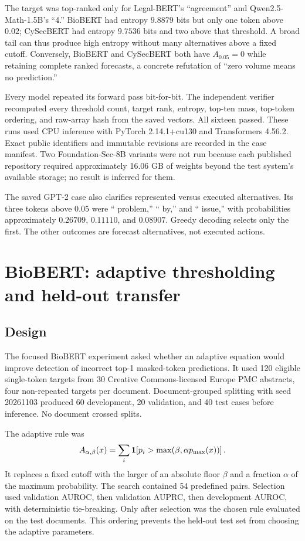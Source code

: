 The target was top-ranked only for Legal-BERT's ``agreement'' and Qwen2.5-Math-1.5B's ``4.'' BioBERT had entropy $9.8879$ bits but only one token above $0.02$; CySecBERT had entropy $9.7536$ bits and two above that threshold. A broad tail can thus produce high entropy without many alternatives above a fixed cutoff. Conversely, BioBERT and CySecBERT both have $A_{0.05}=0$ while retaining complete ranked forecasts, a concrete refutation of ``zero volume means no prediction.''

Every model repeated its forward pass bit-for-bit. The independent verifier recomputed every threshold count, target rank, entropy, top-ten mass, top-token ordering, and raw-array hash from the saved vectors. All sixteen passed. These runs used CPU inference with PyTorch 2.14.1+cu130 and Transformers 4.56.2. Exact public identifiers and immutable revisions are recorded in the case manifest. Two Foundation-Sec-8B variants were not run because each published repository required approximately 16.06 GB of weights beyond the test system's available storage; no result is inferred for them.

The saved GPT-2 case also clarifies represented versus executed alternatives. Its three tokens above $0.05$ were `` problem,'' `` by,'' and `` issue,'' with probabilities approximately $0.26709$, $0.11110$, and $0.08907$. Greedy decoding selects only the first. The other outcomes are forecast alternatives, not executed actions.

\section{BioBERT: adaptive thresholding and held-out transfer}
\subsection{Design}
The focused BioBERT experiment asked whether an adaptive equation would improve detection of incorrect top-1 masked-token predictions. It used 120 eligible single-token targets from 30 Creative Commons-licensed Europe PMC abstracts, four non-repeated targets per document. Document-grouped splitting with seed 20261103 produced 60 development, 20 validation, and 40 test cases before inference. No document crossed splits.

The adaptive rule was
\begin{equation}
A_{\alpha,\beta}(x)=\sum_i\mathbf 1\!\left[
 p_i>\max\!\left(\beta,\alpha p_{\max}(x)\right)\right].
\label{eq:adaptive-volume}
\end{equation}
It replaces a fixed cutoff with the larger of an absolute floor $\beta$ and a fraction $\alpha$ of the maximum probability. The search contained 54 predefined pairs. Selection used validation AUROC, then validation AUPRC, then development AUROC, with deterministic tie-breaking. Only after selection was the chosen rule evaluated on the test documents. This ordering prevents the held-out test set from choosing the adaptive parameters.

